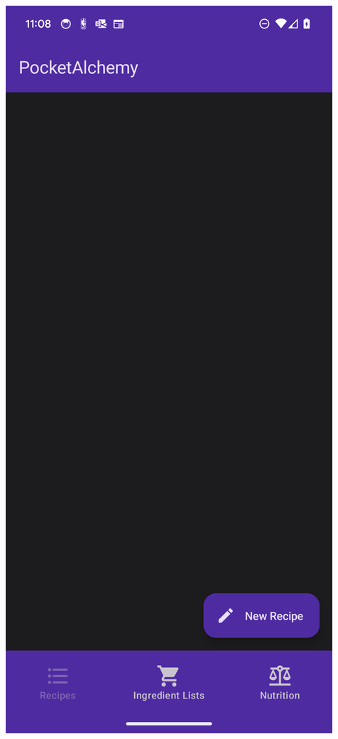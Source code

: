 \documentclass[12pt]{article}
\begin{document}
\begin{center}
\includegraphics[scale=0.175]{../res/img/EmptyListDark.png}

\end{center}
\end{document}

